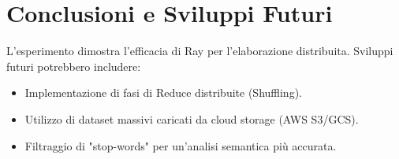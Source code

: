 \documentclass[a4paper,12pt]{article}
\begin{document}
\section{Conclusioni e Sviluppi Futuri}
L'esperimento dimostra l'efficacia di Ray per l'elaborazione distribuita. Sviluppi futuri potrebbero includere:
\begin{itemize}
    \item Implementazione di fasi di Reduce distribuite (Shuffling).
    \item Utilizzo di dataset massivi caricati da cloud storage (AWS S3/GCS).
    \item Filtraggio di "stop-words" per un'analisi semantica più accurata.
\end{itemize}
\end{document}
